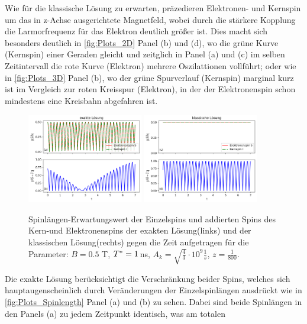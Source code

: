 Wie für die klassische Lösung zu erwarten, präzedieren Elektronen- und Kernspin um das in z-Achse ausgerichtete Magnetfeld, wobei durch die stärkere Kopplung
die Larmorfrequenz für das Elektron deutlich größer ist. Dies macht sich besonders deutlich in \autoref{fig:Plots_2D} Panel (b) und (d), wo die grüne 
Kurve (Kernspin) einer Geraden gleicht und zeitglich in Panel (a) und (c) im selben Zeitintervall die rote Kurve (Elektron) mehrere Oszilattionen vollführt; 
oder wie in \autoref{fig:Plots_3D} Panel (b), wo der grüne Spurverlauf (Kernspin) marginal kurz ist im Vergleich zur roten Kreisspur (Elektron), 
in der der Elektronenspin schon mindestens eine Kreisbahn abgefahren ist.\\ 
\begin{figure}[h]
    \centering
    \includegraphics[width = 0.45\textwidth]{Abbildungen/Plot_Spin_length_index.png}
    \includegraphics[width = 0.45\textwidth]{Abbildungen/Plot_Spin_length_Klassisch_index.png}
    \caption{Spinlängen-Erwartungswert der Einzelspins und addierten Spins des Kern-und Elektronenspins der exakten Lösung(links) und der klassischen 
    Lösung(rechts) gegen die Zeit aufgetragen für die Parameter: $B = 0.5$ T, $T^*= 1 \thinspace$ns, $A_k = \sqrt{\frac{4}{3}}\cdot 10^9 \frac{1}{s}$,
    $z=\frac{1}{800}$.}
    \label{fig:Plots_Spinlength}
\end{figure}
\noindent Die exakte Lösung berücksichtigt die Verschränkung beider Spins, welches sich hauptaugenscheinlich durch Veränderungen der Einzelspinlängen ausdrückt 
wie in \autoref{fig:Plots_Spinlength} Panel (a) und (b) zu sehen. Dabei sind beide Spinlängen in den Panels (a)  zu jedem Zeitpunkt identisch, was am totalen 
